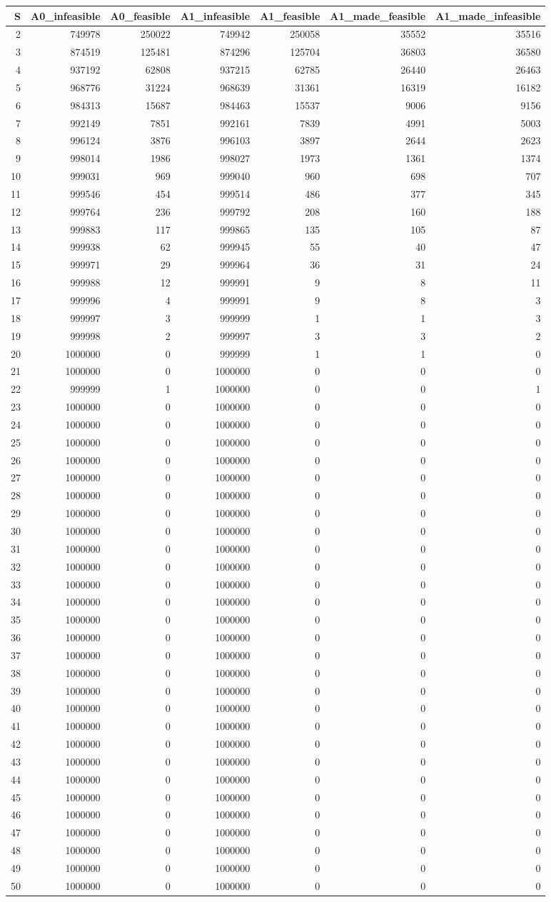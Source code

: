 \documentclass[]{article}
\begin{document}
\begin{longtable}[]{@{}rrrrrrr@{}}
\toprule
S & A0\_infeasible & A0\_feasible & A1\_infeasible & A1\_feasible &
A1\_made\_feasible & A1\_made\_infeasible\tabularnewline
\midrule
\endhead
2 & 749978 & 250022 & 749942 & 250058 & 35552 & 35516\tabularnewline
3 & 874519 & 125481 & 874296 & 125704 & 36803 & 36580\tabularnewline
4 & 937192 & 62808 & 937215 & 62785 & 26440 & 26463\tabularnewline
5 & 968776 & 31224 & 968639 & 31361 & 16319 & 16182\tabularnewline
6 & 984313 & 15687 & 984463 & 15537 & 9006 & 9156\tabularnewline
7 & 992149 & 7851 & 992161 & 7839 & 4991 & 5003\tabularnewline
8 & 996124 & 3876 & 996103 & 3897 & 2644 & 2623\tabularnewline
9 & 998014 & 1986 & 998027 & 1973 & 1361 & 1374\tabularnewline
10 & 999031 & 969 & 999040 & 960 & 698 & 707\tabularnewline
11 & 999546 & 454 & 999514 & 486 & 377 & 345\tabularnewline
12 & 999764 & 236 & 999792 & 208 & 160 & 188\tabularnewline
13 & 999883 & 117 & 999865 & 135 & 105 & 87\tabularnewline
14 & 999938 & 62 & 999945 & 55 & 40 & 47\tabularnewline
15 & 999971 & 29 & 999964 & 36 & 31 & 24\tabularnewline
16 & 999988 & 12 & 999991 & 9 & 8 & 11\tabularnewline
17 & 999996 & 4 & 999991 & 9 & 8 & 3\tabularnewline
18 & 999997 & 3 & 999999 & 1 & 1 & 3\tabularnewline
19 & 999998 & 2 & 999997 & 3 & 3 & 2\tabularnewline
20 & 1000000 & 0 & 999999 & 1 & 1 & 0\tabularnewline
21 & 1000000 & 0 & 1000000 & 0 & 0 & 0\tabularnewline
22 & 999999 & 1 & 1000000 & 0 & 0 & 1\tabularnewline
23 & 1000000 & 0 & 1000000 & 0 & 0 & 0\tabularnewline
24 & 1000000 & 0 & 1000000 & 0 & 0 & 0\tabularnewline
25 & 1000000 & 0 & 1000000 & 0 & 0 & 0\tabularnewline
26 & 1000000 & 0 & 1000000 & 0 & 0 & 0\tabularnewline
27 & 1000000 & 0 & 1000000 & 0 & 0 & 0\tabularnewline
28 & 1000000 & 0 & 1000000 & 0 & 0 & 0\tabularnewline
29 & 1000000 & 0 & 1000000 & 0 & 0 & 0\tabularnewline
30 & 1000000 & 0 & 1000000 & 0 & 0 & 0\tabularnewline
31 & 1000000 & 0 & 1000000 & 0 & 0 & 0\tabularnewline
32 & 1000000 & 0 & 1000000 & 0 & 0 & 0\tabularnewline
33 & 1000000 & 0 & 1000000 & 0 & 0 & 0\tabularnewline
34 & 1000000 & 0 & 1000000 & 0 & 0 & 0\tabularnewline
35 & 1000000 & 0 & 1000000 & 0 & 0 & 0\tabularnewline
36 & 1000000 & 0 & 1000000 & 0 & 0 & 0\tabularnewline
37 & 1000000 & 0 & 1000000 & 0 & 0 & 0\tabularnewline
38 & 1000000 & 0 & 1000000 & 0 & 0 & 0\tabularnewline
39 & 1000000 & 0 & 1000000 & 0 & 0 & 0\tabularnewline
40 & 1000000 & 0 & 1000000 & 0 & 0 & 0\tabularnewline
41 & 1000000 & 0 & 1000000 & 0 & 0 & 0\tabularnewline
42 & 1000000 & 0 & 1000000 & 0 & 0 & 0\tabularnewline
43 & 1000000 & 0 & 1000000 & 0 & 0 & 0\tabularnewline
44 & 1000000 & 0 & 1000000 & 0 & 0 & 0\tabularnewline
45 & 1000000 & 0 & 1000000 & 0 & 0 & 0\tabularnewline
46 & 1000000 & 0 & 1000000 & 0 & 0 & 0\tabularnewline
47 & 1000000 & 0 & 1000000 & 0 & 0 & 0\tabularnewline
48 & 1000000 & 0 & 1000000 & 0 & 0 & 0\tabularnewline
49 & 1000000 & 0 & 1000000 & 0 & 0 & 0\tabularnewline
50 & 1000000 & 0 & 1000000 & 0 & 0 & 0\tabularnewline
\bottomrule
\end{longtable}
\end{document}
